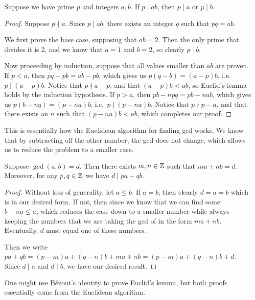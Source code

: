 \begin{theorem}\label{lem:euclid}
    Suppose we have prime \(p\) and integers \(a,b\).
    If \(p \mid ab\), then \(p \mid a\) or \(p \mid b\).
\end{theorem}
\begin{proof}
    Suppose \(p \nmid a\).
    Since \(p \mid ab\),
    there exists an integer \(q\) such that \(pq = ab\).

    We first prove the base case,
    supposing that \(ab = 2\).
    Then the only prime that divides it is 2,
    and we know that \(a = 1\) and \(b = 2\),
    so clearly \(p \mid b\).

    Now proceeding by induction,
    suppose that all values smaller than \(ab\) are proven.
    If \(p < a\),
    then \(pq - pb = ab - pb\),
    which gives us \(p(q-b) = (a-p)b\),
    i.e.\ \(p \mid (a-p)b\).
    Notice that \(p \nmid a-p\),
    and that \((a-p)b < ab\),
    so Euclid's lemma holds by the induction hypothesis.
    If \(p > a\),
    then \(pb - npq = pb - nab\),
    which gives us \(p(b-nq) = (p-na)b\),
    i.e.\ \(p \mid (p-na)b\).
    Notice that \(p \nmid p-a\),
    and that there exists an \(n\) such that \((p-na)b < ab\),
    which completes our proof.
\end{proof}
\begin{remark}
    This is essentially how the Euclidean algorithm for finding gcd works.
    We know that by subtracting off the other number,
    the gcd does not change,
    which allows us to reduce the problem to a smaller case.
\end{remark}

\begin{theorem}\label{thm:bezout}
    Suppose \(\gcd(a,b) = d\).
    Then there exists \(m,n \in \mathbb{Z}\) such that \(ma + nb = d\).
    Moreover, for any \(p,q \in \mathbb{Z}\)
    we have \(d \mid pa + qb\).
\end{theorem}
\begin{proof}
    Without loss of generality, let \(a \leq b\).
    If \(a = b\), then clearly \(d = a = b\) which is in our desired form.
    If not, then since we know that we can find some \(b - na \leq a\),
    which reduces the case down to a smaller number
    while always keeping the numbers that we are taking the gcd of
    in the form \(ma + nb\).
    Eventually, \(d\) must equal one of these numbers.

    Then we write \(pa + qb = (p-m)a + (q-n)b + ma + nb
    = (p-m)a + (q-n)b + d\).
    Since \(d \mid a\) and \(d \mid b\),
    we have our desired result.
\end{proof}
\begin{remark}
    One might use B\'{e}zout's identity to prove Euclid's lemma,
    but both proofs essentially come from the Euclidean algorithm.
\end{remark}

